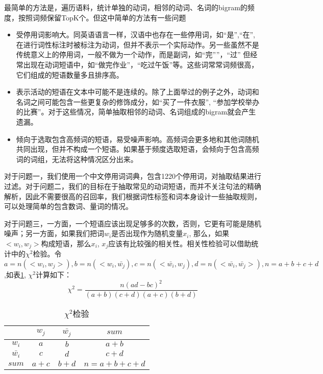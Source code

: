 最简单的方法是，遍历语料，统计单独的动词，相邻的动词、名词的bigram的频度，按照词频保留TopK个。但这中简单的方法有一些问题
\begin{itemize}
\item 受停用词影响大。同英语语言一样，汉语中也存在一些停用词，如``是'',``在'', 在进行词性标注时被标注为动词，但并不表示一个实际动作。另一些虽然不是传统意义上的停用词，一般不做为一个动作，而是副词，如``完''”，``过'' 但经常出现在动词短语中，如``做完作业''，``吃过午饭''等。这些词常常词频很高，它们组成的短语数量多且排序高。
\item 表示活动的短语在文本中可能不是连续的。除了上面举过的例子之外，动词和名词之间可能包含一些更复杂的修饰成分，如``买了一件衣服'', ``参加学校举办的比赛''。对于这些情况，简单抽取相邻的动词、名词组成的bigram就会产生遗漏。
\item 倾向于选取包含高频词的短语，易受噪声影响。高频词会更多地和其他词随机共同出现，但并不构成一个短语。如果基于频度选取短语，会倾向于包含高频词的词组，无法将这种情况区分出来。
\end{itemize}

对于问题一，我们使用一个中文停用词词典，包含1220个停用词，对抽取结果进行过滤。对于问题二，我们的目标在于抽取常见的动词短语，而并不关注句法的精确解析，因此不需要很高的召回率，我们根据词性标签和词本身设计一些抽取规则，可以处理简单的包含数词、量词的情况。

对于问题三，一方面，一个短语应该出现足够多的次数，否则，它更有可能是随机噪声；另一方面，如果我们把词$w_i$是否出现作为随机变量$x_i$, 那么，如果$<w_i, w_j>$构成短语，那么$x_i$, $x_j$应该有比较强的相关性。相关性检验可以借助统计中的$\chi^2$检验。令$a=n(<w_i, w_j>), b=n(<w_i, \bar{w_j}), c=n(<\bar{w_i}, w_j), d=n(<\bar{w_i}, \bar{w_j}>), n=a+b+c+d$,如表\ref{table:chi}, $\chi^2$计算如下：
\begin{equation}
\chi^2 = \frac{n(ad-bc)^2}{(a+b)(c+d)(a+c)(b+d)}
\label{eqn:chi}
\end{equation}

\begin{table}
\centering
\begin{tabular}{|c|c|c|c|}
\hline
				& $w_j$ & $\bar{w_j}$	&	$sum$ \\
\hline
$w_i$ 			& $a$	& $b$ 			& $a+b$ \\
\hline
$\bar{w_i}$ 	& $c$	& $d$ 			& $c+d$ \\
\hline
$sum$ 			& $a+c$	& $b+d$ 		& $n=a+b+c+d$ \\
\hline
\end{tabular}
\caption{$\chi^2$检验}
\label{table:chi}
\end{table}

